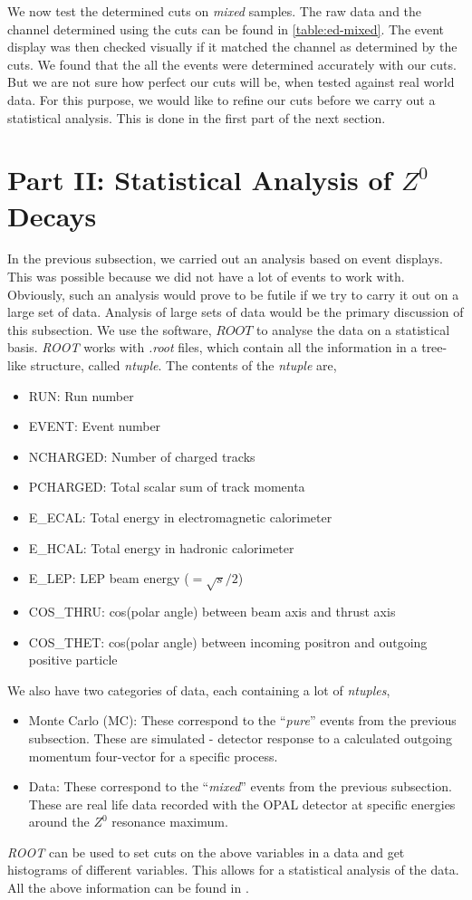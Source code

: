 We now test the determined cuts on \textit{mixed} samples. The raw data and the channel determined using the cuts can be found in \ref{table:ed-mixed}. The event display was then checked visually if it matched the channel as determined by the cuts. We found that the all the events were determined accurately with our cuts. But we are not sure how perfect our cuts will be, when tested against real world data. For this purpose, we would like to refine our cuts before we carry out a statistical analysis. This is done in the first part of the next section.

\section{Part II: Statistical Analysis of $Z^0$ Decays}
In the previous subsection, we carried out an analysis based on event displays. This was possible because we did not have a lot of events to work with. Obviously, such an analysis would prove to be futile if we try to carry it out on a large set of data. Analysis of large sets of data would be the primary discussion of this subsection. We use the software, $ROOT$ to analyse the data on a statistical basis. \textit{ROOT} works with \textit{.root} files, which contain all the information in a tree-like structure, called \textit{ntuple}. The contents of the \textit{ntuple} are,
\begin{itemize}
    \item RUN: Run number
    \item EVENT: Event number
    \item NCHARGED: Number of charged tracks
    \item PCHARGED: Total scalar sum of track momenta
    \item E\_ECAL: Total energy in electromagnetic calorimeter
    \item E\_HCAL: Total energy in hadronic calorimeter
    \item E\_LEP: LEP beam energy ($=\sqrt{s}/2$)
    \item COS\_THRU: cos(polar angle) between beam axis and thrust axis
    \item COS\_THET: cos(polar angle) between incoming positron and outgoing positive particle
\end{itemize}
We also have two categories of data, each containing a lot of \textit{ntuples},
\begin{itemize}
    \item Monte Carlo (MC): These correspond to the ``\textit{pure}'' events from the previous subsection. These are simulated - detector response to a calculated outgoing momentum four-vector for a specific process.
    \item Data: These correspond to the ``\textit{mixed}'' events from the previous subsection. These are real life data recorded with the OPAL detector at specific energies around the $Z^0$ resonance maximum.
\end{itemize}
\textit{ROOT} can be used to set cuts on the above variables in a data and get histograms of different variables. This allows for a statistical analysis of the data. All the above information can be found in \cite{UB}.

